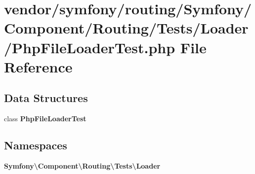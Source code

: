 \section{vendor/symfony/routing/\+Symfony/\+Component/\+Routing/\+Tests/\+Loader/\+Php\+File\+Loader\+Test.php File Reference}
\label{routing_2_symfony_2_component_2_routing_2_tests_2_loader_2_php_file_loader_test_8php}
\subsection*{Data Structures}
\begin{DoxyCompactItemize}
\item 
class {\bf Php\+File\+Loader\+Test}
\end{DoxyCompactItemize}
\subsection*{Namespaces}
\begin{DoxyCompactItemize}
\item 
 {\bf Symfony\textbackslash{}\+Component\textbackslash{}\+Routing\textbackslash{}\+Tests\textbackslash{}\+Loader}
\end{DoxyCompactItemize}
